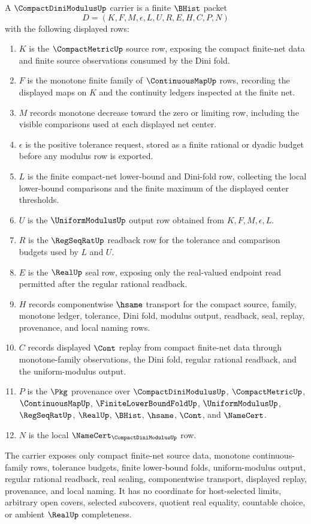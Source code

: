 \begin{definition}
\label{def:compact-dini-modulus-carrier}
A $\CompactDiniModulusUp$ carrier is a finite $\BHist$ packet
$$
D=(K,F,M,\epsilon,L,U,R,E,H,C,P,N)
$$
with the following displayed rows:
\begin{enumerate}
\item $K$ is the $\CompactMetricUp$ source row, exposing the compact finite-net data and finite source observations consumed by the Dini fold.
\item $F$ is the monotone finite family of $\ContinuousMapUp$ rows, recording the displayed maps on $K$ and the continuity ledgers inspected at the finite net.
\item $M$ records monotone decrease toward the zero or limiting row, including the visible comparisons used at each displayed net center.
\item $\epsilon$ is the positive tolerance request, stored as a finite rational or dyadic budget before any modulus row is exported.
\item $L$ is the finite compact-net lower-bound and Dini-fold row, collecting the local lower-bound comparisons and the finite maximum of the displayed center thresholds.
\item $U$ is the $\UniformModulusUp$ output row obtained from $K,F,M,\epsilon,L$.
\item $R$ is the $\RegSeqRatUp$ readback row for the tolerance and comparison budgets used by $L$ and $U$.
\item $E$ is the $\RealUp$ seal row, exposing only the real-valued endpoint read permitted after the regular rational readback.
\item $H$ records componentwise $\hsame$ transport for the compact source, family, monotone ledger, tolerance, Dini fold, modulus output, readback, seal, replay, provenance, and local naming rows.
\item $C$ records displayed $\Cont$ replay from compact finite-net data through monotone-family observations, the Dini fold, regular rational readback, and the uniform-modulus output.
\item $P$ is the $\Pkg$ provenance over $\CompactDiniModulusUp$, $\CompactMetricUp$, $\ContinuousMapUp$, $\FiniteLowerBoundFoldUp$, $\UniformModulusUp$, $\RegSeqRatUp$, $\RealUp$, $\BHist$, $\hsame$, $\Cont$, and $\NameCert$.
\item $N$ is the local $\NameCert_{\CompactDiniModulusUp}$ row.
\end{enumerate}
The carrier exposes only compact finite-net source data, monotone continuous-family rows, tolerance budgets, finite lower-bound folds, uniform-modulus output, regular rational readback, real sealing, componentwise transport, displayed replay, provenance, and local naming. It has no coordinate for host-selected limits, arbitrary open covers, selected subcovers, quotient real equality, countable choice, or ambient $\RealUp$ completeness.
\end{definition}

